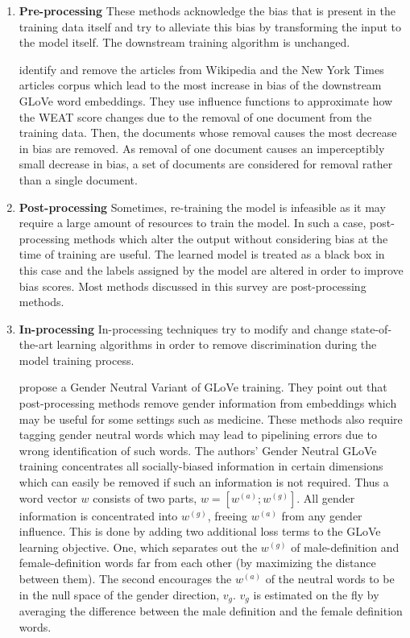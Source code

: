 \documentclass[11pt,a4paper]{article}
\begin{document}
\begin{enumerate}
    \item \textbf{Pre-processing} These methods acknowledge the bias that is present in the training data itself and try to alleviate this bias by transforming the input to the model itself. The downstream training algorithm is unchanged.
    
    \citet{pmlr-v97-brunet19a} identify and remove the articles from Wikipedia and the New York Times articles corpus which lead to the most increase in bias of the downstream GLoVe word embeddings. They use influence functions to approximate how the WEAT score changes due to the removal of one document from the training data. Then, the documents whose removal causes the most decrease in bias are removed. As removal of one document causes an imperceptibly small decrease in bias, a set of documents are considered for removal rather than a single document.
    
    \item \textbf{Post-processing} Sometimes, re-training the model is infeasible as it may require a large amount of resources to train the model. In such a case, post-processing methods which alter the output without considering bias at the time of training are useful. The learned model is treated as a black box in this case and the labels assigned by the model are altered in order to improve bias scores. Most methods discussed in this survey are post-processing methods.
    
    \item \textbf{In-processing} In-processing techniques try to modify and change state-of-the-art learning algorithms in order to remove discrimination during the model training process.
    
    \citet{zhao2018learning} propose a Gender Neutral Variant of GLoVe training. They point out that post-processing methods remove gender information from embeddings which may be useful for some settings such as medicine. These methods also require tagging gender neutral words which may lead to pipelining errors due to wrong identification of such words. The authors' Gender Neutral GLoVe training concentrates all socially-biased information in certain dimensions which can easily be removed if such an information is not required. Thus a word vector $w$ consists of two parts, $w = [w^{(a)};w^{(g)}]$. All gender information is concentrated into $w^{(g)}$, freeing $w^{(a)}$ from any gender influence. This is done by adding two additional loss terms to the GLoVe learning objective. One, which separates out the $w^{(g)}$ of male-definition and female-definition words far from each other (by maximizing the distance between them). The second encourages the $w^{(a)}$ of the neutral words to be in the null space of the gender direction, $v_g$. $v_g$ is estimated on the fly by averaging the difference between the male definition and the female definition words.
    

\end{enumerate}
\end{document}
